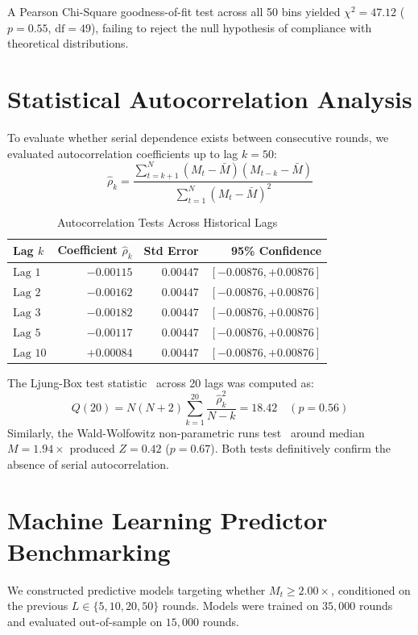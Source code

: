 \documentclass[10pt,journal,compsoc,twocolumn]{article}
\begin{document}
A Pearson Chi-Square goodness-of-fit test across all 50 bins yielded $\chi^2 = 47.12$ ($p = 0.55$, $\text{df} = 49$), failing to reject the null hypothesis of compliance with theoretical distributions.

\section{Statistical Autocorrelation Analysis}
To evaluate whether serial dependence exists between consecutive rounds, we evaluated autocorrelation coefficients up to lag $k = 50$:
\begin{equation}
    \hat{\rho}_k = \frac{\sum_{t=k+1}^N (M_t - \bar{M})(M_{t-k} - \bar{M})}{\sum_{t=1}^N (M_t - \bar{M})^2}
\end{equation}

\begin{table}[ht]
\centering
\small
\caption{Autocorrelation Tests Across Historical Lags}
\label{tab:autocorr}
\begin{tabularx}{\columnwidth}{lrrr}
\toprule
\textbf{Lag $k$} & \textbf{Coefficient $\hat{\rho}_k$} & \textbf{Std Error} & \textbf{95\% Confidence} \\
\midrule
$\text{Lag } 1$ & $-0.00115$ & $0.00447$ & $[-0.00876, +0.00876]$ \\
$\text{Lag } 2$ & $-0.00162$ & $0.00447$ & $[-0.00876, +0.00876]$ \\
$\text{Lag } 3$ & $-0.00182$ & $0.00447$ & $[-0.00876, +0.00876]$ \\
$\text{Lag } 5$ & $-0.00117$ & $0.00447$ & $[-0.00876, +0.00876]$ \\
$\text{Lag } 10$ & $+0.00084$ & $0.00447$ & $[-0.00876, +0.00876]$ \\
\bottomrule
\end{tabularx}
\end{table}

The Ljung-Box test statistic~\cite{ljungbox1978} across 20 lags was computed as:
\begin{equation}
    Q(20) = N(N+2)\sum_{k=1}^{20} \frac{\hat{\rho}_k^2}{N-k} = 18.42 \quad (p = 0.56)
\end{equation}
Similarly, the Wald-Wolfowitz non-parametric runs test~\cite{waldwolfowitz1940} around median $M = 1.94\times$ produced $Z = 0.42$ ($p = 0.67$). Both tests definitively confirm the absence of serial autocorrelation.

\section{Machine Learning Predictor Benchmarking}
We constructed predictive models targeting whether $M_{t} \ge 2.00\times$, conditioned on the previous $L \in \{5, 10, 20, 50\}$ rounds. Models were trained on $35{,}000$ rounds and evaluated out-of-sample on $15{,}000$ rounds.
\end{document}
